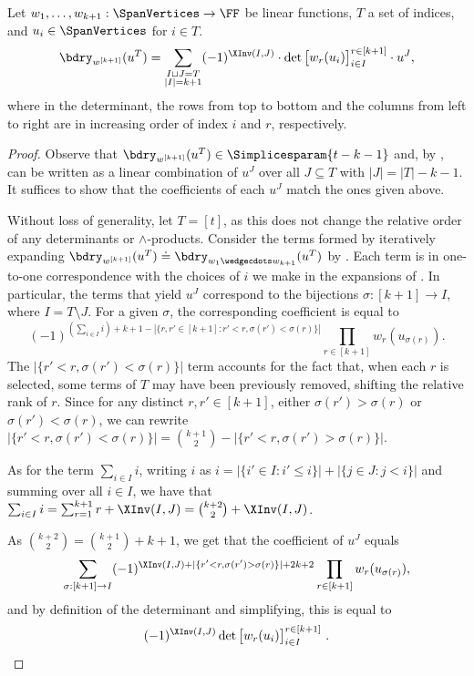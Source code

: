 \documentclass{toc}
\begin{document}
\begin{proposition}
    \label{prop.composed-bdrys}
    Let $w_1,\dots, w_{k+1}:\SpanVertices\to\FF$ be linear functions, $T$ a set of indices, and $u_i \in \SpanVertices$ for $i \in T$.
    \begin{equation}\label{eq.prop.composed-bdrys}
    \bdry_{w^{[k+1]}}(u^T) = \sum_{\substack{I\sqcup J=T \\ |I|=k+1}} 
    (-1)^{\XInv(I,J)} \cdot 
    \det \begin{bmatrix}
        w_{r}(u_i)
    \end{bmatrix}_{i\in I}^{r\in [k+1]}
    \cdot u^J, 
    \end{equation}
    where in the determinant, the rows from top to bottom and the columns from left to right are in increasing order of index $i$ and $r$, respectively.
\end{proposition}
\begin{proof}
    Observe that $\bdry_{w^{[k+1]}}(u^T)\in \Simplicesparam{t-k-1}$ and, by , can be written as a linear combination of $u^J$ over all $J\subseteq T$ with $|J|=|T|-k-1$. It suffices to show that the coefficients of each $u^J$ match the ones given above.

    Without loss of generality, let $T = [t]$, as this does not change the relative order of any determinants or
    $\wedge$-products. Consider the terms formed by iteratively expanding $\bdry_{w^{[k+1]}}(u^T) \doteq \bdry_{w_{1}\wedgecdots w_{k+1}}(u^T)$ by . Each term is in one-to-one correspondence with the choices of $i$ we make in the expansions of . In particular, the terms that yield $u^J$ correspond to the bijections $\sigma:[k+1]\to I$, where $I=T \setminus J$. For a given $\sigma$, the corresponding coefficient is equal to
    \[ (-1)^{(\sum_{i\in I} i) + k+1 - |\{r,r'\in[k+1]: r'<r,\sigma(r')<\sigma(r) \}|} \prod_{r\in [k+1]}w_{r}(u_{\sigma(r)}). \]
    The $|\{r'<r,\sigma(r')<\sigma(r) \}|$ term accounts for the fact that, when each $r$ is selected, some terms of $T$ may have been previously removed, shifting the relative rank of $r$. Since for any distinct $r,r'\in [k+1]$, either $\sigma(r')>\sigma(r)$ or $\sigma(r')<\sigma(r)$, we can rewrite $|\{r'<r,\sigma(r')<\sigma(r) \}| = \binom{k+1}{2} - |\{r'<r,\sigma(r')>\sigma(r) \}|$.
    
    As for the term $\sum_{i\in I}i$, writing $i$ as $i = |\{i' \in I: i' \le i\}| + |\{j \in J: j < i\}|$ and summing over all $i \in I$, we have that
    $\sum_{i \in I} i = \sum_{r=1}^{k+1} r + \XInv(I,J) 
    = \binom{k+2}{2} + \XInv(I,J)$. 
    
    As $\binom{k+2}{2} = \binom{k+1}{2} + k+1$, we get that the coefficient of $u^J$ equals
    \[ \sum_{\sigma:[k+1]\to I} (-1)^{\XInv(I,J)+|\{r'<r,\sigma(r')>\sigma(r) \}| + 2k+2} \prod_{r\in [k+1]} w_{r}(u_{\sigma(r)}), \]
    and by definition of the determinant and simplifying, this is equal to
%
\[ (-1)^{\XInv(I,J)}\det \begin{bmatrix}
    w_{r}(u_i)
      \end{bmatrix}_{i\in I}^{r\in [k+1]}\,.    \qedhere
\]
\end{proof}
\end{document}
